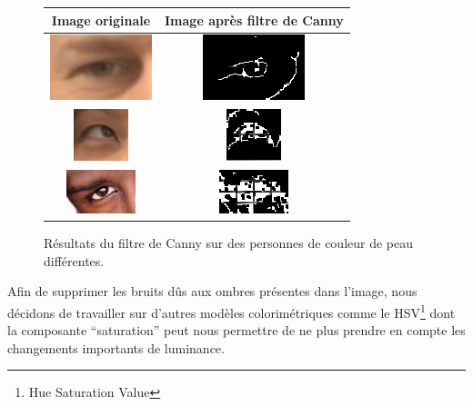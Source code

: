 \begin{figure}[H]
  \center
  \begin{tabular}{|c|c|}
    \hline
    Image originale & Image après filtre de Canny\\
    \hline
    \includegraphics{image/original.png} & \includegraphics{image/canny_final.png}\\
    \hline
    \includegraphics{image/original_asiatique.png} & \includegraphics{image/cannyAsiatique.png}\\
    \hline
    \includegraphics{image/original_black.png} & \includegraphics{image/cannyBlack.png}\\
    \hline
  \end{tabular}
  \caption{Résultats du filtre de Canny sur des personnes de couleur de peau différentes.}
\end{figure}

Afin de supprimer les bruits dûs aux ombres présentes dans l'image, nous décidons de travailler sur d'autres modèles
colorimétriques comme le HSV\footnote{Hue Saturation Value} dont la composante \enquote{saturation} peut nous
permettre de ne plus prendre en compte les changements importants de luminance.

